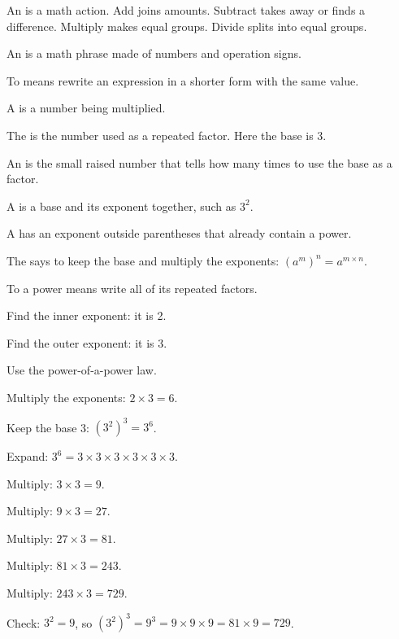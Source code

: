 \begin{words}
  \item An is a math action. Add joins amounts. Subtract takes
    away or finds a difference. Multiply makes equal groups. Divide splits into
    equal groups.
  \item An is a math phrase made of numbers and operation signs.
  \item To means rewrite an expression in a shorter form with the
    same value.
  \item A is a number being multiplied.
  \item The is the number used as a repeated factor. Here the base
    is 3.
  \item An is the small raised number that tells how many times to
    use the base as a factor.
  \item A is a base and its exponent together, such as $3^{2}$.
  \item A has an exponent outside parentheses that already
    contain a power.
  \item The says to keep the base and multiply the
    exponents: $(a^{m})^{n} = a^{m \times n}$.
  \item To a power means write all of its repeated factors.
\end{words}

\begin{steps}
  \item Find the inner exponent: it is 2.
  \item Find the outer exponent: it is 3.
  \item Use the power-of-a-power law.
  \item Multiply the exponents: $2 \times 3 = 6$.
  \item Keep the base 3: $(3^{2})^{3} = 3^{6}$.
  \item Expand: $3^{6} = 3 \times 3 \times 3 \times 3 \times 3 \times 3$.
  \item Multiply: $3 \times 3 = 9$.
  \item Multiply: $9 \times 3 = 27$.
  \item Multiply: $27 \times 3 = 81$.
  \item Multiply: $81 \times 3 = 243$.
  \item Multiply: $243 \times 3 = 729$.
  \item Check: $3^{2} = 9$, so $(3^{2})^{3} = 9^{3} = 9 \times 9 \times 9
    = 81 \times 9 = 729$.
\end{steps}

